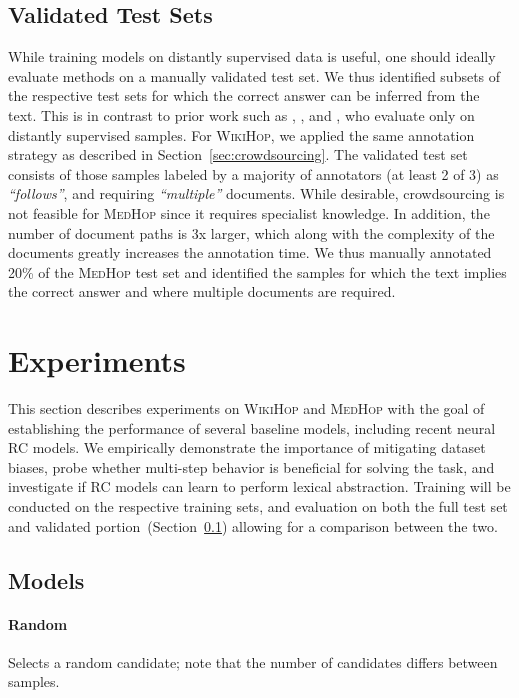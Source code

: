 \documentclass[11pt,letterpaper]{article}
\newcommand{\MedHop}{\textsc{MedHop}\xspace}
\newcommand{\WikiHop}{\textsc{WikiHop}\xspace}
\begin{document}
\subsection{Validated Test Sets}\label{sec:test_verification}
While training models on distantly supervised data is useful, one should ideally evaluate methods on a manually validated test set.
We thus identified subsets of the respective test sets for which the correct answer can be inferred from the text.
This is in contrast to prior work such as , , and , who evaluate only on distantly supervised samples.
For \WikiHop, we applied the same annotation strategy as described in Section~\ref{sec:crowdsourcing}.
The validated test set consists of those samples labeled by a majority of annotators (at least 2 of 3) as \emph{``follows''}, and requiring  \emph{``multiple''} documents.
While desirable, crowdsourcing is not feasible for \MedHop since it requires specialist knowledge.
In addition, the number of document paths is 3x larger, which along with the complexity of the documents greatly increases the annotation time.
We thus manually annotated 20\% of the \MedHop test set and identified the samples for which the text implies the correct answer and where multiple documents are required.




\section{Experiments}\label{sec:experiments}
This section describes experiments on \WikiHop and \MedHop with the goal of establishing the performance of several baseline models, including recent neural RC models.
We empirically demonstrate the importance of mitigating dataset biases, probe whether multi-step behavior is beneficial for solving the task, and investigate if RC models can learn to perform lexical abstraction.
Training will be conducted on the respective training sets, and evaluation on both the full test set and validated portion~(Section~\ref{sec:test_verification}) allowing for a comparison between the two.


\subsection{Models}
\paragraph{Random}
Selects a random candidate; note that the number of candidates differs between samples.
\end{document}
